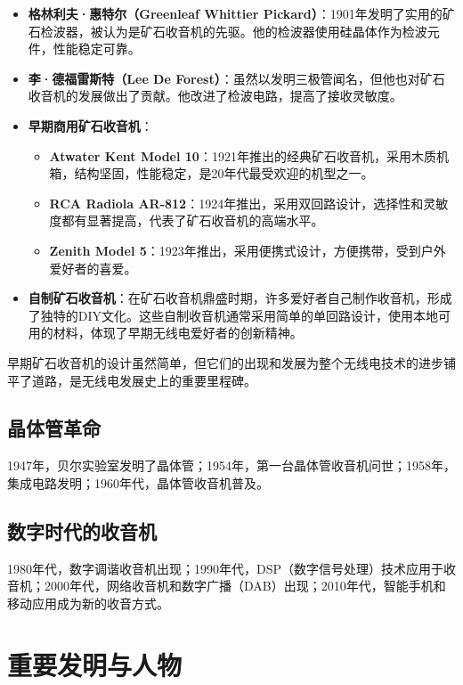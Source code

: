 \documentclass[12pt,UTF8]{ctexbook}
\begin{document}
\begin{itemize}[leftmargin=3.5em]
    \item \textbf{格林利夫·惠特尔（Greenleaf Whittier Pickard）}：1901年发明了实用的矿石检波器，被认为是矿石收音机的先驱。他的检波器使用硅晶体作为检波元件，性能稳定可靠。
    \item \textbf{李·德福雷斯特（Lee De Forest）}：虽然以发明三极管闻名，但他也对矿石收音机的发展做出了贡献。他改进了检波电路，提高了接收灵敏度。
    \item \textbf{早期商用矿石收音机}：
        \begin{itemize}[leftmargin=3.5em]
            \item \textbf{Atwater Kent Model 10}：1921年推出的经典矿石收音机，采用木质机箱，结构坚固，性能稳定，是20年代最受欢迎的机型之一。
            \item \textbf{RCA Radiola AR-812}：1924年推出，采用双回路设计，选择性和灵敏度都有显著提高，代表了矿石收音机的高端水平。
            \item \textbf{Zenith Model 5}：1923年推出，采用便携式设计，方便携带，受到户外爱好者的喜爱。
        \end{itemize}
    \item \textbf{自制矿石收音机}：在矿石收音机鼎盛时期，许多爱好者自己制作收音机，形成了独特的DIY文化。这些自制收音机通常采用简单的单回路设计，使用本地可用的材料，体现了早期无线电爱好者的创新精神。
\end{itemize}

早期矿石收音机的设计虽然简单，但它们的出现和发展为整个无线电技术的进步铺平了道路，是无线电发展史上的重要里程碑。

\section{晶体管革命}

1947年，贝尔实验室发明了晶体管；1954年，第一台晶体管收音机问世；1958年，集成电路发明；1960年代，晶体管收音机普及。

\section{数字时代的收音机}

1980年代，数字调谐收音机出现；1990年代，DSP（数字信号处理）技术应用于收音机；2000年代，网络收音机和数字广播（DAB）出现；2010年代，智能手机和移动应用成为新的收音方式。

\chapter{重要发明与人物}
\end{document}
